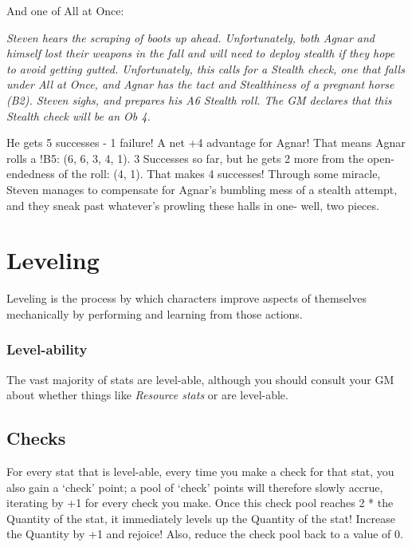 \documentclass[../main.tex]{subfiles}
\begin{document}
        And one of All at Once:

        \begin{displayquote}
            {\em Steven hears the scraping of boots up ahead. Unfortunately, both Agnar and himself lost their weapons in the fall and will need to deploy stealth if they hope to avoid getting gutted. Unfortunately, this calls for a Stealth check, one that falls under All at Once, and Agnar has the tact and Stealthiness of a pregnant horse (B2). Steven sighs, and prepares his A6 Stealth roll. The GM declares that this Stealth check will be an Ob 4.
        
            He gets 5 successes - 1 failure! A net +4 advantage for Agnar! That means Agnar rolls a !B5: (6, 6, 3, 4, 1). 3 Successes so far, but he gets 2 more from the open-endedness of the roll: (4, 1). That makes 4 successes! Through some miracle, Steven manages to compensate for Agnar's bumbling mess of a stealth attempt, and they sneak past whatever's prowling these halls in one- well, two pieces.}
    \end{displayquote}

    \section{Leveling}

    Leveling is the process by which characters improve aspects of themselves mechanically by performing and learning from those actions. 

    \subsubsection{Level-ability}

    The vast majority of stats are level-able, although you should consult your GM about whether things like \emph{Resource stats} or \emph{} are level-able.

    \subsection{Checks}

    For every stat that is level-able, every time you make a check for that stat, you also gain a `check' point; a pool of `check' points will therefore slowly accrue, iterating by +1 for every check you make. Once this check pool reaches 2 * the Quantity of the stat, it immediately levels up the Quantity of the stat! Increase the Quantity by +1 and rejoice! Also, reduce the check pool back to a value of 0.
\end{document}
